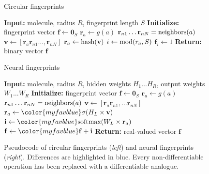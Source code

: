 \documentclass{article}
\newcommand{\vv}{\mathbf{v}}
\newcommand{\vf}{\mathbf{f}}
\newcommand{\vi}{\mathbf{i}}
\newcommand{\vr}{\mathbf{r}}
\newcommand{\vzero}{\mathbf{0}}
\begin{document}
\begin{figure}[t]
 \begin{minipage}[t]{0.49\columnwidth}
 \begin{algorithm}[H]
\caption{Circular fingerprints} 
\label{alg:ecfp} 
\begin{algorithmic}[1]
\State \textbf{Input:} {molecule, radius $R$, fingerprint length $S$}
\State \textbf{Initialize:} {fingerprint vector $\vf \leftarrow \vzero_S$}
    \State $\vr_a \leftarrow g(a)$ 
\EndFor
{} 
		\State $\vr_{n1} \dots \vr_{nN} = \textnormal{neighbors}(a)$
		\State $\vv \leftarrow [\vr_a \vr_{n1} \dots, \vr_{nN}]$ 
		\State $\vr_a \leftarrow \textnormal{hash}(\vv)$ 
		\State $i \leftarrow \textnormal{mod}(r_a, S)$ 		
		\State $\vf_{i} \leftarrow 1$ 
	\EndFor
\EndFor
\State \textbf{Return:} {binary vector $\vf$}
\end{algorithmic}
\end{algorithm}
\end{minipage}
\hfill
\begin{minipage}[t]{0.49\columnwidth}
\begin{algorithm}[H]
\caption{Neural fingerprints} 
\label{alg:neural} 
\begin{algorithmic}[1]
\State \textbf{Input:} {molecule, radius $R$, {\color{myfavblue} hidden weights $H_1 \dots H_R$, output weights $W_1 \dots W_R$}}
\State \textbf{Initialize:} {fingerprint vector $\vf \leftarrow \vzero_S$}
	\State $\vr_a \leftarrow g(a)$ 
\EndFor
{} 
		\State $\vr_{n1} \dots \vr_{nN} = \textnormal{neighbors}(a)$
		\State $\vv \leftarrow [\vr_a \vr_{n1}, \dots \vr_{nN}]$ 
		\State $\vr_a \leftarrow {\color{myfavblue} \sigma(H_L \times \vv)}$ 
		\State $\vi \leftarrow {\color{myfavblue} \textnormal{softmax}(W_L \times \vr_a)}$ 
		\State $\vf \leftarrow {\color{myfavblue} \vf + \vi}$ 
    \EndFor
\EndFor
\State \textbf{Return:} { {\color{myfavblue} real-valued} vector $\vf$}
\end{algorithmic}
\end{algorithm}
\end{minipage}
\hfill
\caption{Pseudocode of circular fingerprints (\emph{left}) and neural fingerprints (\emph{right}).
Differences are highlighted in blue.
Every non-differentiable operation has been replaced with a differentiable analogue.}
\end{figure}
\end{document}
